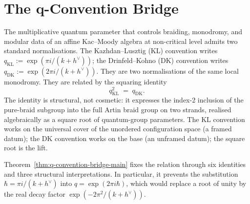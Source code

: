 %
%

\providecommand{\bbC}{\mathbb{C}}
\providecommand{\bbZ}{\mathbb{Z}}
\providecommand{\bbQ}{\mathbb{Q}}
\providecommand{\bbR}{\mathbb{R}}
\providecommand{\fg}{\mathfrak{g}}
\providecommand{\hv}{h^{\vee}}
\providecommand{\Conf}{\mathrm{Conf}}
\providecommand{\KL}{\mathrm{KL}}
\providecommand{\DK}{\mathrm{DK}}
\providecommand{\GRT}{\mathrm{GRT}}
\providecommand{\Rep}{\mathrm{Rep}}

\chapter{The q-Convention Bridge}
\label{app:q-convention-bridge}

The multiplicative quantum parameter that controls braiding,
monodromy, and modular data of an affine Kac--Moody algebra at
non-critical level admits two standard normalisations. The
Kazhdan--Lusztig (KL) convention writes
$q_{\KL} := \exp(\pi i / (k + \hv))$; the Drinfeld--Kohno (DK)
convention writes $q_{\DK} := \exp(2\pi i / (k + \hv))$. They are
two normalisations of the same local monodromy. They are related by the squaring
identity
\begin{equation}
\label{eq:q-bridge}
\boxed{\; q_{\KL}^{2} \;=\; q_{\DK}. \;}
\end{equation}
The identity is structural, not cosmetic: it expresses the index-2
inclusion of the pure-braid subgroup into the full Artin braid
group on two strands, realised algebraically as a square root of
quantum-group parameters. The KL convention works on the universal
cover of the unordered configuration space (a framed datum); the
DK convention works on the base (an unframed datum); the square
root is the lift.

Theorem~\ref{thm:q-convention-bridge-main} fixes the relation through six
identities and three structural interpretations.  In particular, it prevents
the substitution \(\hbar=\pi i/(k+\hv)\) into
\(q=\exp(2\pi i\hbar)\), which would replace a root of unity by the real
decay factor \(\exp(-2\pi^2/(k+\hv))\).

